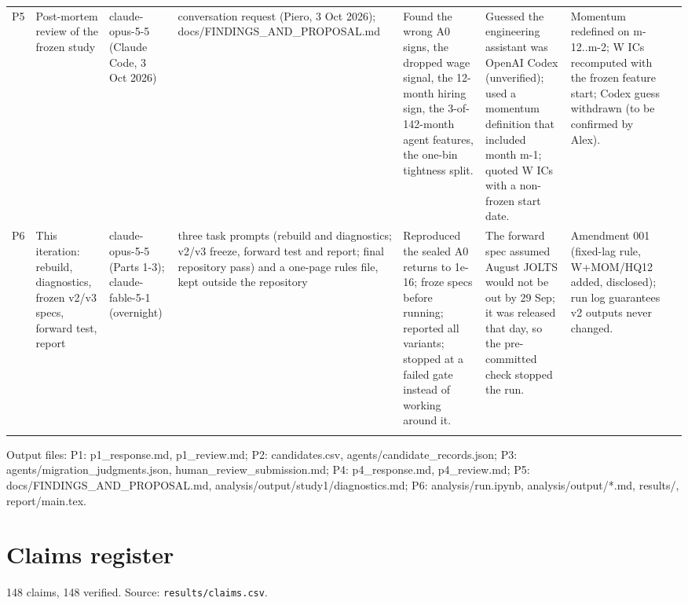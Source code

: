 {\begin{longtable}{@{}p{0.5cm}p{2.0cm}p{1.8cm}p{2.1cm}p{2.2cm}p{2.2cm}p{2.2cm}p{1.4cm}@{}}
P5 & Post-mortem review of the frozen study & claude-opus-5-5 (Claude Code, 3 Oct 2026) & conversation request (Piero, 3 Oct 2026); docs/\allowbreak{}FINDINGS\_\allowbreak{}AND\_\allowbreak{}PROPOSAL.md & Found the wrong A0 signs, the dropped wage signal, the 12-month hiring sign, the 3-of-142-month agent features, the one-bin tightness split. & Guessed the engineering assistant was OpenAI Codex (unverified); used a momentum definition that included month m-1; quoted W ICs with a non-frozen start date. & Momentum redefined on m-12..m-2; W ICs recomputed with the frozen feature start; Codex guess withdrawn (to be confirmed by Alex). &  \\ \addlinespace
P6 & This iteration: rebuild, diagnostics, frozen v2/\allowbreak{}v3 specs, forward test, report & claude-opus-5-5 (Parts 1-3); claude-fable-5-1 (overnight) & three task prompts (rebuild and diagnostics; v2/\allowbreak{}v3 freeze, forward test and report; final repository pass) and a one-page rules file, kept outside the repository & Reproduced the sealed A0 returns to 1e-16; froze specs before running; reported all variants; stopped at a failed gate instead of working around it. & The forward spec assumed August JOLTS would not be out by 29 Sep; it was released that day, so the pre-committed check stopped the run. & Amendment 001 (fixed-lag rule, W+MOM/\allowbreak{}HQ12 added, disclosed); run log guarantees v2 outputs never changed. &  \\ \addlinespace
\bottomrule\end{longtable}}
Output files: P1: p1\_\allowbreak{}response.md, p1\_\allowbreak{}review.md; P2: candidates.csv, agents/\allowbreak{}candidate\_\allowbreak{}records.json; P3: agents/\allowbreak{}migration\_\allowbreak{}judgments.json, human\_\allowbreak{}review\_\allowbreak{}submission.md; P4: p4\_\allowbreak{}response.md, p4\_\allowbreak{}review.md; P5: docs/\allowbreak{}FINDINGS\_\allowbreak{}AND\_\allowbreak{}PROPOSAL.md, analysis/\allowbreak{}output/\allowbreak{}study1/\allowbreak{}diagnostics.md; P6: analysis/\allowbreak{}run.ipynb, analysis/\allowbreak{}output/\allowbreak{}*.md, results/\allowbreak{}, report/\allowbreak{}main.tex.
\clearpage\section{Claims register}
148 claims, 148 verified. Source: \texttt{results/claims.csv}.
